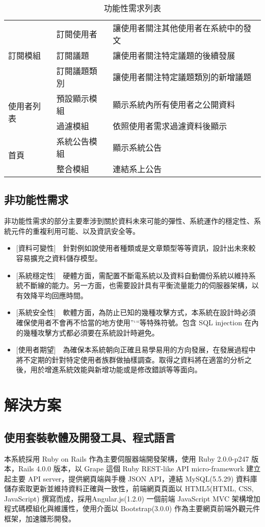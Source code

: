\documentclass[11pt]{article}
\begin{document}
\begin{table}[t]
\begin{tabular}{ | l | l | l | }
\multirow{3}{*}{訂閱模組}
& 訂閱使用者 & 讓使用者關注其他使用者在系統中的發文 \\
& 訂閱議題 & 讓使用者關注特定議題的後續發展 \\
& 訂閱議題類別 & 讓使用者關注特定議題類別的新增議題 \\ \hline
\multirow{2}{*}{使用者列表}
& 預設顯示模組 & 顯示系統內所有使用者之公開資料 \\
& 過濾模組 & 依照使用者需求過濾資料後顯示 \\ \hline
\multirow{2}{*}{首頁}
& 系統公告模組 & 顯示系統公告 \\
& 整合模組 & 連結系上公告 \\ \hline
\end{tabular}
\caption{功能性需求列表}
\label{req}
\end{table}

\subsection{非功能性需求}
非功能性需求的部分主要牽涉到關於資料未來可能的彈性、系統運作的穩定性、系統元件的重複利用可能、以及資訊安全等。
\begin{itemize}
\item{[資料可變性]~~針對例如說使用者種類或是文章類型等等資訊，設計出未來較容易擴充之資料儲存模型。 }
\item{[系統穩定性]~~硬體方面，需配置不斷電系統以及資料自動備份系統以維持系統不斷線的能力。另一方面，也需要設計具有平衡流量能力的伺服器架構，以有效降平均回應時間。}
\item{[系統安全性]~~軟體方面，為防止已知的幾種攻擊方式，本系統在設計時必須確保使用者不會再不恰當的地方使用”‘“等特殊符號。包含 SQL injection 在內的幾種攻擊方式都必須要在系統設計時避免。}
\item{[使用者期望]~~為確保本系統朝向正確且易學易用的方向發展，在發展過程中將不定期的針對特定使用者族群做抽樣調查。取得之資料將在適當的分析之後，用於增進系統效能與新增功能或是修改錯誤等等面向。}
\end{itemize}

\section{解決方案}



\subsection{使用套裝軟體及開發工具、程式語言}
本系統採用 Ruby on Rails 作為主要伺服器端開發架構，使用 Ruby 2.0.0-p247 版本，Rails 4.0.0 版本，以 Grape 這個 Ruby REST-like API micro-framework 建立起主要 API server，提供網頁端與手機 JSON API，連結 MySQL(5.5.29) 資料庫儲存索取更新並維持資料正確與一致性，前端網頁頁面以 HTML5(HTML, CSS, JavaScript) 撰寫而成，採用Angular.js(1.2.0) 一個前端 JavaScript MVC 架構增加程式碼模組化與維護性，使用介面以 Bootstrap(3.0.0) 作為主要網頁前端外觀元件框架，加速雛形開發。
\end{document}
